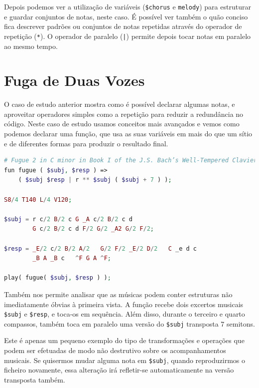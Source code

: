 Depois podemos ver a utilização de variáveis (\texttt{\$chorus} e \texttt{melody}) para estruturar e guardar conjuntos de notas, neste caso.
É possível ver também o quão conciso fica descrever padrões ou conjuntos de notas repetidas através do operador de repetição (\texttt{*}). O operador de paralelo (\texttt{|}) permite depois tocar notas em paralelo ao mesmo tempo.

\section{Fuga de Duas Vozes}
\label{casestudies:fugue}
O caso de estudo anterior mostra como é possível declarar algumas notas, e aproveitar operadores simples como a repetição para reduzir a redundância no código. Neste caso de estudo usamos conceitos mais avançados e vemos como podemos declarar uma função, que usa as suas variáveis em mais do que um sítio e de diferentes formas para produzir o resultado final.
\begin{lstlisting}[caption=Exemplo da declaração da estrutura e conteúdo de uma simples fuga de duas vozes,language=PHP]
# Fugue 2 in C minor in Book I of the J.S. Bach’s Well-Tempered Clavier
fun fugue ( $subj, $resp ) => 
    ( $subj $resp | r ** $subj ( $subj + 7 ) );

S8/4 T140 L/4 V120;

$subj = r c/2 B/2 c G _A c/2 B/2 c d
        G c/2 B/2 c d F/2 G/2 _A2 G/2 F/2;

$resp = _E/2 c/2 B/2 A/2   G/2 F/2 _E/2 D/2   C _e d c
        _B A _B c   ^F G A ^F;

play( fugue( $subj, $resp ) );
\end{lstlisting}

Também nos permite analisar que as músicas podem conter estruturas não imediatamente óbvias à primeira vista. A função recebe dois excertos musicais \texttt{\$subj} e \texttt{\$resp}, e toca-os em sequência. Além disso, durante o terceiro e quarto compassos, também toca em paralelo uma versão do \texttt{\$subj} transposta 7 semitons. 

Este é apenas um pequeno exemplo do tipo de transformações e operações que podem ser efetuadas de modo não destrutivo sobre os acompanhamentos musicais. Se quisermos mudar alguma nota em \texttt{\$subj}, quando reproduzirmos o ficheiro novamente, essa alteração irá refletir-se automaticamente na versão transposta também.

